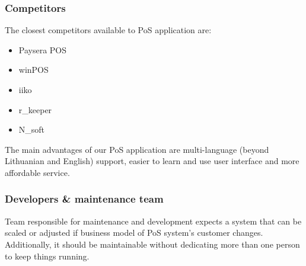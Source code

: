 \documentclass{article}
\begin{document}
\subsubsection{Competitors}The closest competitors available to PoS application are:
\begin{itemize}
    \item Paysera POS
    \item winPOS
    \item iiko
    \item r\_keeper
    \item N\_soft
\end{itemize}
The main advantages of our PoS application are multi-language (beyond Lithuanian and English) support, easier to learn and use user interface and more affordable service.
\subsubsection{Developers \& maintenance team}
Team responsible for maintenance and development expects a system that can be scaled or adjusted if business model of PoS system's customer changes. Additionally, it should be maintainable without dedicating more than one person to keep things running.  
\end{document}
